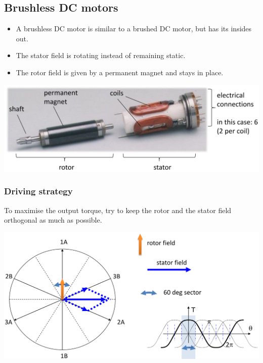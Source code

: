\documentclass[11pt]{article}
\begin{document}
\subsection{Brushless DC motors}
\label{sec:org87aaffd}
\begin{itemize}
\item A brushless DC motor is similar to a brushed DC motor, but has its insides out.
\item The stator field is rotating instead of remaining static.
\item The rotor field is given by a permanent magnet and stays in place.
\end{itemize}

\begin{center}
\includegraphics[width=.9\linewidth]{./images/brushless-dc-motor-components.png}
\end{center}
\subsubsection{Driving strategy}
\label{sec:orgaac746f}
To maximise the output torque, try to keep the rotor and the stator field orthogonal as much as possible.

\begin{center}
\includegraphics[width=.9\linewidth]{./images/brushless-dc-motor-driving-strategy.png}
\end{center}

 \newpage
\end{document}
